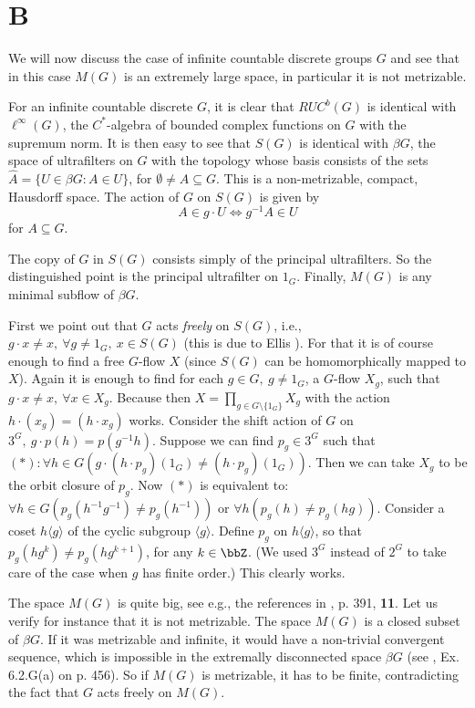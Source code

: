 \section{B}
We will now discuss the case of infinite countable discrete
groups $G$ and see that in this case $M(G)$ is an extremely large space,
in particular it is not metrizable.

For an infinite countable discrete $G$, it is clear that $RUC^b(G)$ is
identical with $\ell^\infty (G)$, the $C^*$-algebra of bounded complex
functions on $G$ with the supremum norm.  It is then easy to see that
$S(G)$ is identical with $\beta G$, the space of ultrafilters on $G$ with
the topology whose basis consists of the sets $\hat A=\{U\in\beta G:
    A\in U\}$, for $\emptyset\neq A\subseteq G$.  This is a non-metrizable,
compact, Hausdorff space.  The action of $G$ on $S(G)$ is given by
\[
    A\in g\cdot U\Leftrightarrow g^{-1}A\in U
\]
for $A\subseteq G$.

The copy of $G$ in $S(G)$ consists simply of the principal ultrafilters.
So the distinguished point is the principal ultrafilter on $1_G$.  Finally, $M(G)$ is any minimal subflow
of $\beta G$.

First we point out that $G$ acts {\it freely} on $S(G)$, i.e., $g\cdot
    x\neq x,\ \forall g\neq 1_G,\ x\in S(G)$ (this is due to Ellis \cite{E60}).
For that it is of course enough to find a free $G$-flow $X$
(since $S(G)$ can be homomorphically mapped to $X$).  Again it is enough
to find for each $g\in G,\ g\neq 1_G$, a $G$-flow $X_g$, such
that $g\cdot x\neq x,\ \forall x\in X_g$.  Because then $X=\prod_{g\in G
        \setminus\{1_G\}}X_g$ with the action $h\cdot (x_g)=(h\cdot x_g)$ works.
Consider the shift action of $G$ on $3^G,\ g\cdot p(h)=p(g^{-1}h)$.
Suppose we can find $p_g\in 3^G$ such that $(*):\forall h\in G(g\cdot
    (h\cdot p_g)(1_G)\neq (h\cdot p_g)(1_G))$.  Then we can take $X_g$ to be
the orbit closure of $p_g$.  Now $(*)$ is equivalent to:  $\forall h\in G
    (p_g(h^{-1}g^{-1})\neq p_g(h^{-1}))$ or $\forall h(p_g(h)\neq p_g(hg))$.
Consider a coset $h\langle g\rangle$ of the cyclic subgroup $\langle g
    \rangle$.  Define $p_g$ on $h\langle g\rangle$, so that $p_g(hg^k)\neq
    p_g(hg^{k+1})$, for any $k\in\bbZ$.  (We used $3^G$ instead of $2^G$
to take care of the case when $g$ has finite order.)  This clearly works.

The space $M(G)$ is quite big, see e.g., the references in \cite{dV},
p. 391, {\bf 11}.  Let us verify for instance that it is not metrizable.
The space $M(G)$ is a closed subset of $\beta G$.  If it was metrizable
and infinite, it would have a non-trivial convergent sequence, which is
impossible in the extremally disconnected space $\beta G$ (see \cite{Eng},
Ex. 6.2.G(a) on p. 456).  So if $M(G)$ is metrizable, it has to be
finite, contradicting the fact that $G$ acts freely on $M(G)$.
\medskip

